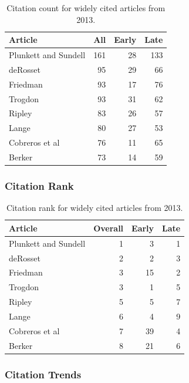 \documentclass[
  10pt,
  letterpaper,
  DIV=11,
  numbers=noendperiod,
  twoside]{scrartcl}
\begin{document}
\begin{longtable}[]{@{}lrrr@{}}

\caption{\label{tbl-citation-count-2013}Citation count for widely cited
articles from 2013.}

\tabularnewline

\toprule\noalign{}
Article & All & Early & Late \\
\midrule\noalign{}
\endhead
\bottomrule\noalign{}
\endlastfoot
Plunkett and Sundell & 161 & 28 & 133 \\
deRosset & 95 & 29 & 66 \\
Friedman & 93 & 17 & 76 \\
Trogdon & 93 & 31 & 62 \\
Ripley & 83 & 26 & 57 \\
Lange & 80 & 27 & 53 \\
Cobreros et al & 76 & 11 & 65 \\
Berker & 73 & 14 & 59 \\

\end{longtable}

\subsubsection*{Citation Rank}\label{sec-rank-2013}

\begin{longtable}[]{@{}lrrr@{}}

\caption{\label{tbl-citation-rank-2013}Citation rank for widely cited
articles from 2013.}

\tabularnewline

\toprule\noalign{}
Article & Overall & Early & Late \\
\midrule\noalign{}
\endhead
\bottomrule\noalign{}
\endlastfoot
Plunkett and Sundell & 1 & 3 & 1 \\
deRosset & 2 & 2 & 3 \\
Friedman & 3 & 15 & 2 \\
Trogdon & 3 & 1 & 5 \\
Ripley & 5 & 5 & 7 \\
Lange & 6 & 4 & 9 \\
Cobreros et al & 7 & 39 & 4 \\
Berker & 8 & 21 & 6 \\

\end{longtable}

\subsubsection*{Citation Trends}\label{sec-trends-2013}
\end{document}
